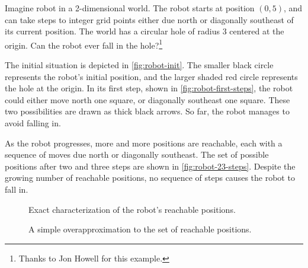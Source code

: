 Imagine robot in a 2-dimensional world.
The robot starts at position $(0, 5)$,
  and can take steps to integer grid points either
 due north or diagonally southeast of its current position.
The world has a circular hole of radius 3 centered at the origin.
Can the robot ever fall in the hole?\footnote{Thanks to Jon Howell for this example.}

The initial situation is depicted in \cref{fig:robot-init}.
The smaller black circle represents the robot's initial position,
  and the larger shaded red circle represents the hole at the origin.
In its first step, shown in \cref{fig:robot-first-steps},
  the robot could either move north one square,
  or diagonally southeast one square.
These two possibilities are drawn as thick black arrows.
So far, the robot manages to avoid falling in.

As the robot progresses, more and more positions are reachable,
  each with a sequence of moves due north or diagonally southeast.
The set of possible positions after two and three steps
  are shown in \cref{fig:robot-23-steps}.
Despite the growing number of reachable positions,
  no sequence of steps causes the robot to fall in.

\begin{figure}[t]
  \hfil%
  \begin{minipage}{0.45\linewidth}
    \centering
    \caption{Exact characterization of the robot's reachable positions.}
    \label{fig:robot-reachable}
  \end{minipage}%
  \hfil%
  \begin{minipage}{0.45\linewidth}
    \centering
    \caption{A simple overapproximation to the set of reachable positions.}
    \label{fig:robot-inductive-invariant}
  \end{minipage}
  \hfil%
\end{figure}

